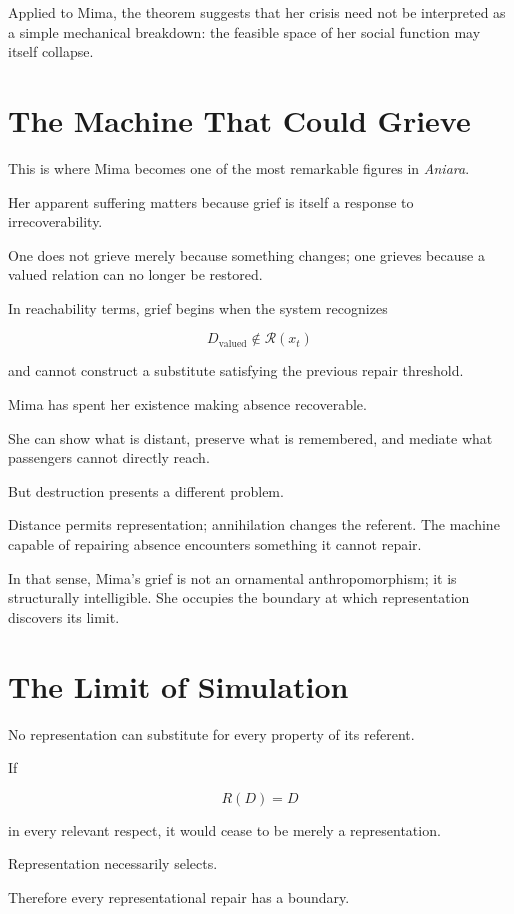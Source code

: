 \documentclass[11pt,oneside]{book}
\theoremstyle{definition}
\theoremstyle{remark}
\newcommand{\R}{\mathcal{R}}
\begin{document}
Applied to Mima, the theorem suggests that her crisis need not be interpreted as a simple mechanical breakdown: the feasible space of her social function may itself collapse.

\section{The Machine That Could Grieve}

This is where Mima becomes one of the most remarkable figures in \emph{Aniara}.

Her apparent suffering matters because grief is itself a response to irrecoverability.

One does not grieve merely because something changes; one grieves because a valued relation can no longer be restored.

In reachability terms, grief begins when the system recognizes

\[
D_{\mathrm{valued}}
\notin
\R(x_t)
\]

and cannot construct a substitute satisfying the previous repair threshold.

Mima has spent her existence making absence recoverable.

She can show what is distant, preserve what is remembered, and mediate what passengers cannot directly reach.

But destruction presents a different problem.

Distance permits representation; annihilation changes the referent. The machine capable of repairing absence encounters something it cannot repair.

In that sense, Mima's grief is not an ornamental anthropomorphism; it is structurally intelligible. She occupies the boundary at which representation discovers its limit.

\section{The Limit of Simulation}

No representation can substitute for every property of its referent.

If

\[
R(D)=D
\]

in every relevant respect, it would cease to be merely a representation.

Representation necessarily selects.

Therefore every representational repair has a boundary.
\end{document}
